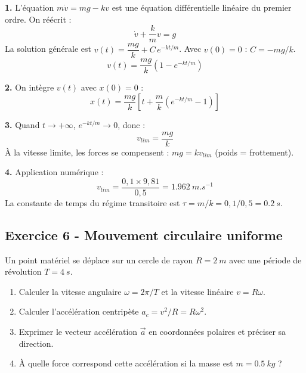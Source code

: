 \documentclass[12pt,a4paper]{article}
\begin{document}
\begin{boitecorrige}
\textbf{1.} L'équation $m\dot{v} = mg - kv$ est une équation différentielle linéaire du premier ordre. On réécrit :
\[
\dot{v} + \frac{k}{m}v = g
\]
La solution générale est $v(t) = \dfrac{mg}{k} + C\,e^{-kt/m}$. Avec $v(0) = 0$ : $C = -mg/k$.
\[
\boxed{v(t) = \frac{mg}{k}\left(1 - e^{-kt/m}\right)}
\]

\textbf{2.} On intègre $v(t)$ avec $x(0) = 0$ :
\[
\boxed{x(t) = \frac{mg}{k}\left[t + \frac{m}{k}\left(e^{-kt/m} - 1\right)\right]}
\]

\textbf{3.} Quand $t \to +\infty$, $e^{-kt/m} \to 0$, donc :
\[
\boxed{v_{lim} = \frac{mg}{k}}
\]
À la vitesse limite, les forces se compensent : $mg = kv_{lim}$ (poids = frottement).

\textbf{4.} Application numérique :
\[
v_{lim} = \frac{0{,}1 \times 9{,}81}{0{,}5} = \qty{1.962}{m.s^{-1}}
\]
La constante de temps du régime transitoire est $\tau = m/k = 0{,}1/0{,}5 = \qty{0.2}{s}$.
\end{boitecorrige}

\subsection*{Exercice 6 - Mouvement circulaire uniforme \niveau{\facile}}

\begin{boiteexercice}
Un point matériel se déplace sur un cercle de rayon $R = \qty{2}{m}$ avec une période de révolution $T = \qty{4}{s}$.
\begin{enumerate}
  \item Calculer la vitesse angulaire $\omega = 2\pi/T$ et la vitesse linéaire $v = R\omega$.
  \item Calculer l'accélération centripète $a_c = v^2/R = R\omega^2$.
  \item Exprimer le vecteur accélération $\vec{a}$ en coordonnées polaires et préciser sa direction.
  \item À quelle force correspond cette accélération si la masse est $m = \qty{0.5}{kg}$ ?
\end{enumerate}
\end{boiteexercice}
\end{document}
